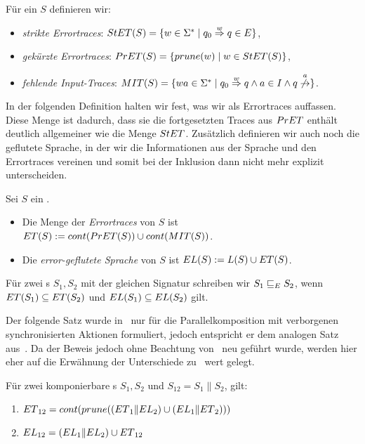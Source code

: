 \begin{Def}[Errortraces]
  \label{DefErrortraces}
  Für ein \EIO{} $S$ definieren wir:
  \begin{itemize}
    \item \emph{strikte Errortraces}: $StET{}(S)=\{w\in\Sigma
      ^*\mid q_0\overset{w}{\Rightarrow}q\in E\}$,
    \item \emph{gekürzte Errortraces}: $PrET{}(S)=\{prune{}(w)\mid w\in StET{}(S)\}$,
    \item \emph{fehlende Input-Traces}: $\MIT{}(S)=\{wa\in\Sigma ^*\mid
      q_0\overset{w}{\Rightarrow}q\wedge a\in I\wedge
    q\overset{a}{\not{\hspace{-0.1cm}\rightarrow}}\}$.
  \end{itemize}
\end{Def}

In der folgenden Definition halten wir fest, was wir als Errortraces auffassen.
Diese Menge ist dadurch, dass sie die fortgesetzten Traces aus $PrET{}$ enthält
deutlich allgemeiner wie die Menge $StET{}$. Zusätzlich definieren wir auch noch
die geflutete Sprache, in der wir die Informationen aus der Sprache und den
Errortraces vereinen und somit bei der Inklusion dann nicht mehr explizit
unterscheiden.

\begin{Def}
  \label{DefETEL}
  Sei $S$ ein \EIO{}.
  \begin{itemize}
    \item Die Menge der \emph{Errortraces} von $S$ ist $ET{}(S):=cont{}(PrET{}(S))\cup
      cont{}(MIT{}(S))$.
    \item Die \emph{error-geflutete Sprache} von $S$ ist $EL{}(S):=L(S)\cup ET{}(S)$.
  \end{itemize}
  Für zwei \EIO{}s $S_1, S_2$ mit der gleichen Signatur schreiben wir
  $S_1\sqsubseteq _E S_2$, wenn $ET{}(S_1)\subseteq ET{}(S_2)$ und
  $EL{}(S_1)\subseteq EL{}(S_2)$ gilt.
\end{Def}

Der folgende Satz wurde in~\cite{Vogler2014EIO} nur für die Parallelkomposition
mit verborgenen synchronisierten Aktionen formuliert, jedoch entspricht er dem
analogen Satz aus~\cite{Schlosser2012BA}. Da der Beweis jedoch ohne Beachtung
von~\cite{Schlosser2012BA} neu geführt wurde, werden hier eher auf die
Erwähnung der Unterschiede zu~\cite{Vogler2014EIO} wert gelegt.

\begin{satz}
  \label{satzErrorSemanik}
  Für zwei komponierbare \EIO{}s $S_1, S_2$ und $S_{12}=S_1\|S_2$, gilt:
  \begin{enumerate}
    \item $ET{}_{12}=cont{}(prune{}((ET{}_1\|EL{}_2)\cup(EL{}_1\|ET{}_2)))$
    \item $EL{}_{12}=(EL{}_1\|EL{}_2)\cup ET{}_{12}$
  \end{enumerate}
\end{satz}

